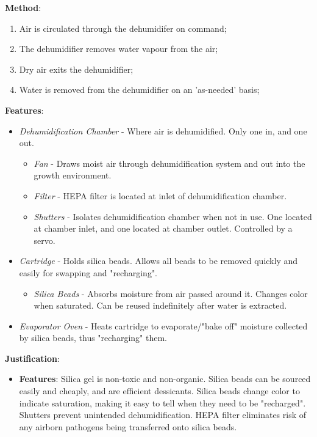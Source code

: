 \documentclass{report}
\begin{document}
\textbf{Method}:
\begin{enumerate}
    \item Air is circulated through the dehumidifer on command;
    \item The dehumidifier removes water vapour from the air;
    \item Dry air exits the dehumidifier;
    \item Water is removed from the dehumidifier on an 'as-needed' basis;
\end{enumerate}

\textbf{Features}:
\begin{itemize}
    \item \textit{Dehumidification Chamber} - Where air is dehumidified. Only one in, and one out.
    \begin{itemize}
        \item \textit{Fan} - Draws moist air through dehumidification system and out into the growth environment.
        \item \textit{Filter} - HEPA filter is located at inlet of dehumidification chamber.
        \item \textit{Shutters} - Isolates dehumidification chamber when not in use. One located at chamber inlet, and one located at chamber outlet. Controlled by a servo.
    \end{itemize}
    \item \textit{Cartridge} - Holds silica beads. Allows all beads to be removed quickly and easily for swapping and "recharging".
    \begin{itemize}
        \item \textit{Silica Beads} - Absorbs moisture from air passed around it. Changes color when saturated. Can be reused indefinitely after water is extracted.
    \end{itemize}
    \item \textit{Evaporator Oven} - Heats cartridge to evaporate/"bake off" moisture collected by silica beads, thus "recharging" them.
\end{itemize}

\textbf{Justification}: 
\begin{itemize}
    \item \textbf{Features}: Silica gel is non-toxic and non-organic. Silica beads can be sourced easily and cheaply, and are efficient dessicants. Silica beads change color to indicate saturation, making it easy to tell when they need to be "recharged". Shutters prevent unintended dehumidification. HEPA filter eliminates risk of any airborn pathogens being transferred onto silica beads.
\end{itemize}
\end{document}
